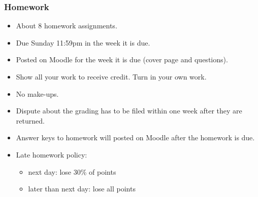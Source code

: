 \documentclass[slidestop,compress,mathserif]{beamer}
\begin{document}
\begin{frame}
\frametitle{Homework}

\begin{itemize}

\item About 8 homework assignments.

\item Due Sunday 11:59pm in the week it is due. 

\item Posted on Moodle for the week it is due (cover page and questions).

\pause
\item Show all your work to receive credit. Turn in your own work.

\item No make-ups.

\item Dispute about the grading has to be filed within one week after they are returned.

\item Answer keys to homework will posted on Moodle after the homework is due.
\pause

\item Late homework policy:
\begin{itemize}
\item next day: lose 30\% of points
\item later than next day: lose all points
\end{itemize}

\end{itemize}

\end{frame}

\end{document}
